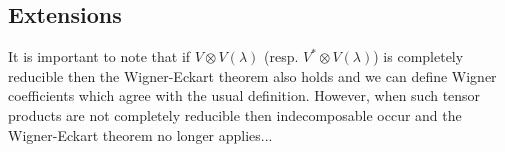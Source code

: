 \documentclass[12pt]{article}
\begin{document}
\subsection{Extensions}
It is important to note that if $V \otimes V(\lambda)$ (resp. $V^* \otimes V(\lambda)$)
is completely reducible then the Wigner-Eckart theorem also holds and we can define Wigner coefficients which agree with the usual definition. However, when such tensor products are not completely reducible then indecomposable occur and the Wigner-Eckart theorem no longer applies...







%
\end{document}
